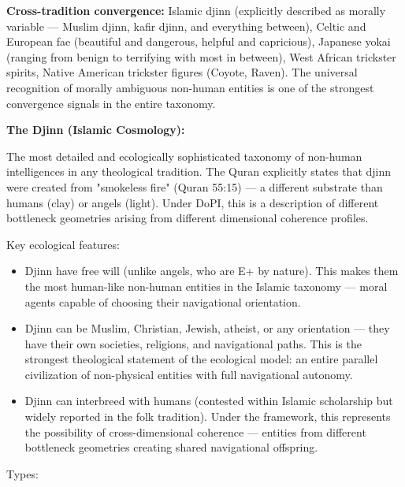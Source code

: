 \textbf{Cross-tradition convergence:} Islamic djinn (explicitly described as morally variable — Muslim djinn, kafir djinn, and everything between), Celtic and European fae (beautiful and dangerous, helpful and capricious), Japanese yokai (ranging from benign to terrifying with most in between), West African trickster spirits, Native American trickster figures (Coyote, Raven). The universal recognition of morally ambiguous non-human entities is one of the strongest convergence signals in the entire taxonomy.


\textbf{The Djinn (Islamic Cosmology):}


The most detailed and ecologically sophisticated taxonomy of non-human intelligences in any theological tradition. The Quran explicitly states that djinn were created from "smokeless fire" (Quran 55:15) — a different substrate than humans (clay) or angels (light). Under DoPI, this is a description of different bottleneck geometries arising from different dimensional coherence profiles.


Key ecological features:

\begin{itemize}[nosep,leftmargin=*]
  \item Djinn have free will (unlike angels, who are E+ by nature). This makes them the most human-like non-human entities in the Islamic taxonomy — moral agents capable of choosing their navigational orientation.
  \item Djinn can be Muslim, Christian, Jewish, atheist, or any orientation — they have their own societies, religions, and navigational paths. This is the strongest theological statement of the ecological model: an entire parallel civilization of non-physical entities with full navigational autonomy.
  \item Djinn can interbreed with humans (contested within Islamic scholarship but widely reported in the folk tradition). Under the framework, this represents the possibility of cross-dimensional coherence — entities from different bottleneck geometries creating shared navigational offspring.
\end{itemize}


Types:

